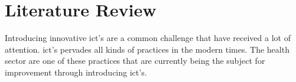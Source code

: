 \chapter{Literature Review}
Introducing innovative \gls{ict}'s are a common challenge that have received a lot of attention.
\gls{ict}'s pervades all kinds of practices in the modern times.
The health sector are one of these practices that are currently being the subject for improvement through introducing \gls{ict}'s.
















